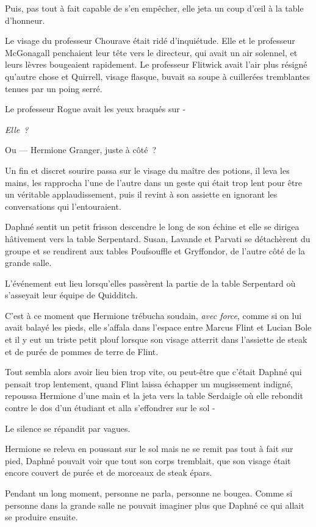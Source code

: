Puis, pas tout à fait capable de s'en empêcher, elle jeta un coup d'œil à la table d'honneur.

Le visage du professeur Chourave était ridé d'inquiétude. Elle et le professeur McGonagall penchaient leur tête vers le directeur, qui avait un air solennel, et leurs lèvres bougeaient rapidement. Le professeur Flitwick avait l'air plus résigné qu'autre chose et Quirrell, visage flasque, buvait sa soupe à cuillerées tremblantes tenues par un poing serré.

Le professeur Rogue avait les yeux braqués sur -

\emph{Elle~?}

Ou — Hermione Granger, juste à côté~?

Un fin et discret sourire passa sur le visage du maître des potions, il leva les mains, les rapprocha l'une de l'autre dans un geste qui était trop lent pour être un véritable applaudissement, puis il revint à son assiette en ignorant les conversations qui l'entouraient.

Daphné sentit un petit frisson descendre le long de son échine et elle se dirigea hâtivement vers la table Serpentard. Susan, Lavande et Parvati se détachèrent du groupe et se rendirent aux tables Poufsouffle et Gryffondor, de l'autre côté de la grande salle.

L'événement eut lieu lorsqu'elles passèrent la partie de la table Serpentard où s'asseyait leur équipe de Quidditch.

C'est à ce moment que Hermione trébucha soudain, \emph{avec force}, comme si on lui avait balayé les pieds, elle s'affala dans l'espace entre Marcus Flint et Lucian Bole et il y eut un triste petit plouf lorsque son visage atterrit dans l'assiette de steak et de purée de pommes de terre de Flint.

Tout sembla alors avoir lieu bien trop vite, ou peut-être que c'était Daphné qui pensait trop lentement, quand Flint laissa échapper un mugissement indigné, repoussa Hermione d'une main et la jeta vers la table Serdaigle où elle rebondit contre le dos d'un étudiant et alla s'effondrer sur le sol -

Le silence se répandit par vagues.

Hermione se releva en poussant sur le sol mais ne se remit pas tout à fait sur pied, Daphné pouvait voir que tout son corps tremblait, que son visage était encore couvert de purée et de morceaux de steak épars.

Pendant un long moment, personne ne parla, personne ne bougea. Comme si personne dans la grande salle ne pouvait imaginer plus que Daphné ce qui allait se produire ensuite.

